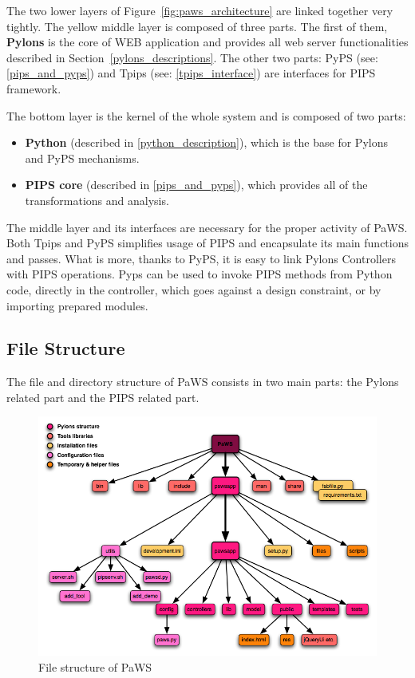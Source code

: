 The two lower layers of Figure~\ref{fig:paws_architecture} are linked
together very tightly. The yellow middle layer is composed of three
parts. The first of them, {\bf Pylons} is the core of WEB application
and provides all web server functionalities described in
Section~\ref{pylons_descriptions}. The other two parts: PyPS (see:
\ref{pips_and_pyps}) and Tpips (see: \ref{tpips_interface}) are
interfaces for PIPS framework.

The bottom layer is the kernel of the whole system and is composed of
two parts:

\begin{itemize}

\item {\bf Python} (described in \ref{python_description}), which is
  the base for Pylons and PyPS mechanisms.

\item {\bf PIPS core} (described in \ref{pips_and_pyps}), which
  provides all of the transformations and analysis.

\end{itemize}

The middle layer and its interfaces are necessary for the proper
activity of PaWS. Both Tpips and PyPS simplifies usage of PIPS and
encapsulate its main functions and passes. What is more, thanks to
PyPS, it is easy to link Pylons Controllers with PIPS operations. Pyps
can be used to invoke PIPS methods from Python code, directly in the
controller, which goes against a design constraint, or by importing
prepared modules.

\subsection{File Structure}
\label{structure}

The file and directory structure of PaWS consists in two main
parts: the Pylons related part and the PIPS related part.

\begin{figure}[h!]
  \centering
  \includegraphics[width=1.0\textwidth]{reportCh2/paws-structure}
  \caption{File structure of PaWS}
  \label{fig:paws_structure}
\end{figure} 

